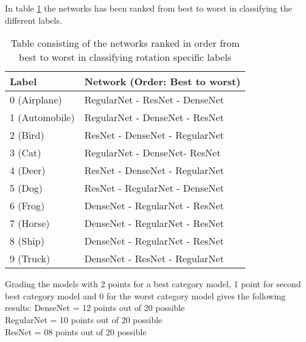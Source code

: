 In table \ref{table:results} the networks has been ranked from best to worst in classifying the different labels. 

\begin{table}[]
	\centering
	\caption{Table consisting of the networks ranked in order from best to worst in classifying rotation specific labels}
	\label{table:results}
	\begin{tabular}{|l|l|}
		\hline
		Label          & Network (Order: Best to worst) \\ \hline
		0 (Airplane)   & RegularNet - ResNet - DenseNet \\ \hline
		1 (Automobile) & RegularNet - DenseNet - ResNet \\ \hline
		2 (Bird)       & ResNet - DenseNet - RegularNet \\ \hline
		3 (Cat)        & RegularNet - DenseNet- ResNet  \\ \hline
		4 (Deer)       & ResNet - DenseNet - RegularNet \\ \hline
		5 (Dog)        & ResNet - RegularNet - DenseNet \\ \hline
		6 (Frog)       & DenseNet - RegularNet - ResNet \\ \hline
		7 (Horse)      & DenseNet - RegularNet - ResNet \\ \hline
		8 (Ship)       & DenseNet - RegularNet - ResNet \\ \hline
		9 (Truck)      & DenseNet - ResNet - RegularNet \\ \hline
	\end{tabular}
\end{table}
\FloatBarrier

Grading the models with 2 points for a best category model, 1 point for second best category model and 0 for the worst category model gives the following results:
DenseNet   = 12 points out of 20 possible\\
RegularNet = 10 points out of 20 possible\\
ResNet     = 08 points out of 20 possible\\
